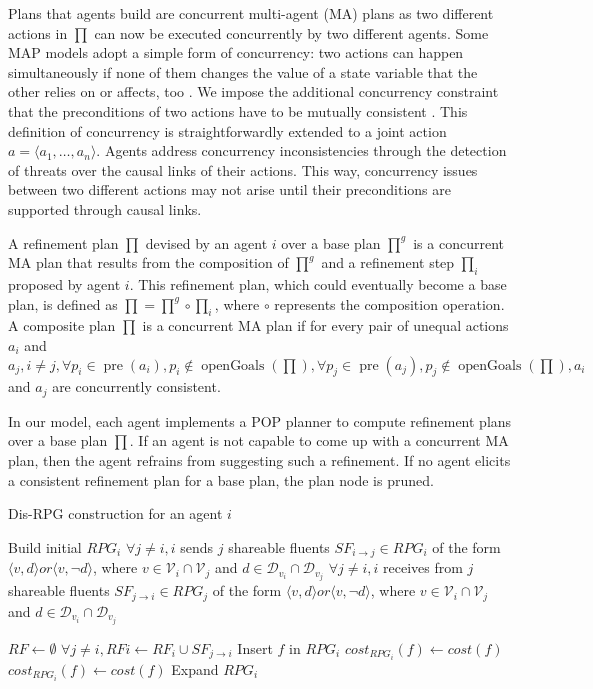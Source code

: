 \documentclass[12pt]{article}
\DeclareMathOperator{\pre}{pre}
\DeclareMathOperator{\openGoals}{openGoals}
\begin{document}
Plans that agents build are concurrent multi-agent (MA) plans as two different actions in $\prod$ can now be executed concurrently by two different agents. Some MAP models adopt a simple form of concurrency: two actions can happen simultaneously if none of them changes the value of a state variable that the other relies on or affects, too \cite{Brenner2009}. We impose the additional concurrency constraint that the preconditions of two actions have to be mutually consistent \cite{Boutilier_2001}. This definition of concurrency is straightforwardly extended to a joint action $a = \langle a_1,\ldots, a_n\rangle$. Agents address concurrency inconsistencies through the detection of threats over the causal links of their actions. This way, concurrency issues between two different actions may not arise until their preconditions are supported through causal links.

A refinement plan $\prod$ devised by an agent $i$ over a base plan $\prod^g$ is a concurrent MA plan that results from the composition of $\prod^g$ and a refinement step $\prod_i$ proposed by agent $i$. This refinement plan, which could eventually become a base plan, is defined as $\prod = \prod^g \circ \prod_i$, where $\circ$ represents the composition operation. A composite plan $\prod$ is a concurrent MA plan if for every pair of unequal actions $a_i$ and $a_j, i \neq j, \forall p_i \in \pre(a_i), p_i \notin \openGoals(\prod), \forall p_j \in \pre(a_j), p_j \notin \openGoals(\prod), a_i$ and $a_j$ are concurrently consistent.

In our model, each agent implements a POP planner to compute refinement plans over a base plan $\prod$. If an agent is not capable to come up with a concurrent MA plan, then the agent refrains from suggesting such a refinement. If no agent elicits a consistent refinement plan for a base plan, the plan node is pruned.

\begin{algorithm}
\caption{Dis-RPG construction for an agent $i$}
\label{alg:1}
  \begin{algorithmic}
  \State Build initial $RPG_i$
  \Repeat
    \State $\forall j \neq i, i$ sends $j$ shareable fluents $SF_{i\rightarrow j} \in RPG_i$ of the form $\langle v,d\rangle or \langle v,\neg d\rangle$, where $v \in \mathcal{V}_i \cap \mathcal{V}_j$ and $d \in \mathcal{D}_{v_i} \cap \mathcal{D}_{v_j}$
    \State $\forall j \neq i, i$ receives from $j$ shareable fluents $SF_{j\rightarrow i} \in RPG_j$ of the form $\langle v,d\rangle or \langle v,\neg d\rangle$, where $v \in \mathcal{V}_i \cap \mathcal{V}_j$ and $d \in \mathcal{D}_{v_i} \cap \mathcal{D}_{v_j}$

      \State $RF \leftarrow \emptyset$
      $\forall j \neq i, RFi \leftarrow RF_i \cup SF_{j\rightarrow i}$
          \State Insert $f$ in $RPG_i$
          \State $cost_{RPG_i}(f) \leftarrow cost(f)$
        \EndIf
          \State $cost_{RPG_i}(f) \leftarrow cost(f)$
        \EndIf
      \EndFor
      \State Expand $RPG_i$
  \end{algorithmic}
\end{algorithm}
\end{document}
